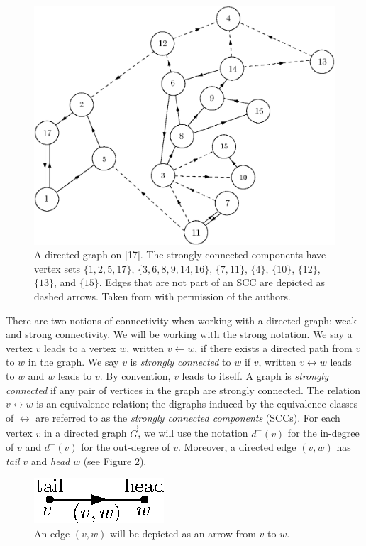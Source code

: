 \begin{figure}
    \centering
    \includegraphics[scale=0.6]{Content/Pictures/biggraph.eps}
    \caption{A directed graph on [17]. The strongly connected components have vertex sets $\{1,2,5,17\}$, $\{3,6,8,9,14,16\}$, $\{7,11\}$, $\{4\}$, $\{10\}$, $\{12\}$, $\{13\}$, and $\{15\}$. Edges that are not part of an SCC are depicted as dashed arrows. Taken from \cite{goldschmidtScalingLimitCritical2019} with permission of the authors.}
    \label{fig.SCCs}
\end{figure}

There are two notions of connectivity when working with a directed graph: weak and strong connectivity. We will be working with the strong notation. We say a vertex $v$ leads to a vertex $w$, written $v \leftarrow w$, if there exists a directed path from $v$ to $w$ in the graph. We say $v$ is \emph{strongly connected} to $w$ if $v$, written $v \leftrightarrow w$ leads to $w$ and $w$ leads to $v$. By convention, $v$ leads to itself. A graph is \emph{strongly connected} if any pair of vertices in the graph are strongly connected. The relation $v \leftrightarrow w$ is an equivalence relation; the digraphs induced by the equivalence classes of $\leftrightarrow$ are referred to as the \emph{strongly connected components} (SCCs). For each vertex $v$ in a directed graph $\vec{G}$, we will use the notation $d^-(v)$ for the in-degree of $v$ and $d^+(v)$ for the out-degree of $v$. Moreover, a directed edge $(v,w)$ has \emph{tail} $v$ and \emph{head} $w$ (see Figure \ref{fig.tailhead}).
\begin{figure}
    \centering
    \includegraphics{Content/Pictures/tail_head.eps}
    \caption{An edge $(v,w)$ will be depicted as an arrow from $v$ to $w$.}\label{fig.tailhead}
\end{figure}


